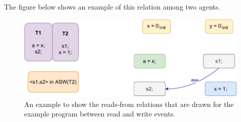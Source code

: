             The figure below shows an example of this relation among two agents. 
            \begin{figure}[H]
                \centering
                \includegraphics[scale=0.7]{4.ECMAScriptMemoryModel/AgentSyncWith.pdf}
                \caption{An example to show the reads-from relations that are drawn for the example program between read and write events.}
                \label{agent-sync-with}
            \end{figure}
        
